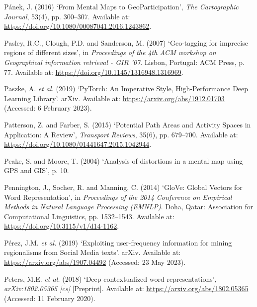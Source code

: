 \documentclass[
  letterpaper,
  11pt,
  english,
  onehalfspacing,
  headsepline]{MastersDoctoralThesis}
\newlength{\cslhangindent}
\newlength{\cslentryspacingunit} %
\newenvironment{CSLReferences}[2] %
 {%
  \setlength{\parindent}{0pt}
  \ifodd #1
  \let\oldpar\par
  \def\par{\hangindent=\cslhangindent\oldpar}
  \fi
  \setlength{\parskip}{#2\cslentryspacingunit}
 }%
 {}
\begin{document}
\begin{CSLReferences}{0}{0}
\leavevmode{}%
Pánek, J. (2016) {`From {Mental Maps} to {GeoParticipation}'}, \emph{The
Cartographic Journal}, 53(4), pp. 300--307. Available at:
\url{https://doi.org/10.1080/00087041.2016.1243862}.

\leavevmode{}%
Pasley, R.C., Clough, P.D. and Sanderson, M. (2007) {`Geo-tagging for
imprecise regions of different sizes'}, in \emph{Proceedings of the 4th
{ACM} workshop on {Geographical} information retrieval - {GIR} '07}.
{Lisbon, Portugal}: {ACM Press}, p. 77. Available at:
\url{https://doi.org/10.1145/1316948.1316969}.

\leavevmode{}%
Paszke, A. \emph{et al.} (2019) {`{PyTorch}: {An Imperative Style},
{High-Performance Deep Learning Library}'}. {arXiv}. Available at:
\url{https://arxiv.org/abs/1912.01703} (Accessed: 6 February 2023).

\leavevmode{}%
Patterson, Z. and Farber, S. (2015) {`Potential {Path Areas} and
{Activity Spaces} in {Application}: {A Review}'}, \emph{Transport
Reviews}, 35(6), pp. 679--700. Available at:
\url{https://doi.org/10.1080/01441647.2015.1042944}.

\leavevmode{}%
Peake, S. and Moore, T. (2004) {`Analysis of distortions in a mental map
using {GPS} and {GIS}'}, p. 10.

\leavevmode{}%
Pennington, J., Socher, R. and Manning, C. (2014) {`{GloVe}: {Global
Vectors} for {Word Representation}'}, in \emph{Proceedings of the 2014
{Conference} on {Empirical Methods} in {Natural Language Processing}
({EMNLP})}. {Doha, Qatar}: {Association for Computational Linguistics},
pp. 1532--1543. Available at: \url{https://doi.org/10.3115/v1/d14-1162}.

\leavevmode{}%
Pérez, J.M. \emph{et al.} (2019) {`Exploiting user-frequency information
for mining regionalisms from {Social Media} texts'}. {arXiv}. Available
at: \url{https://arxiv.org/abs/1907.04492} (Accessed: 23 May 2023).

\leavevmode{}%
Peters, M.E. \emph{et al.} (2018) {`Deep contextualized word
representations'}, \emph{arXiv:1802.05365 {[}cs{]}} {[}Preprint{]}.
Available at: \url{https://arxiv.org/abs/1802.05365} (Accessed: 11
February 2020).


\end{CSLReferences}
\end{document}
